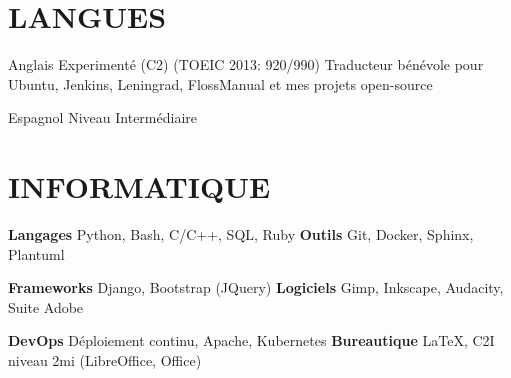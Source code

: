 \documentclass[11pt,a4paper]{moderncv}
\begin{document}



  \section{LANGUES}

  \cvlanguage
    {Anglais}
    {Experimenté (C2) (TOEIC 2013: 920/990)}
    {Traducteur bénévole pour Ubuntu, Jenkins, Leningrad, FlossManual et mes projets open-source}

  \cvlanguage
    {Espagnol}
    {Niveau Intermédiaire}
    {}{}{}{}

  \section{INFORMATIQUE}

  \cvcomputer
    {\textbf{Langages}}
    {Python, Bash, C/C++, SQL, Ruby}
    {\textbf{Outils}}
    {Git, Docker, Sphinx, Plantuml}

  \cvcomputer
    {\textbf{Frameworks}}
    {Django, Bootstrap (JQuery)}
    {\textbf{Logiciels}}
    {Gimp, Inkscape, Audacity, Suite Adobe}

  \cvcomputer
    {\textbf{DevOps}}
    {Déploiement continu, Apache, Kubernetes}
    {\textbf{Bureautique}}
    {\LaTeX{}, C2I niveau 2mi (LibreOffice, Office)}
\end{document}
